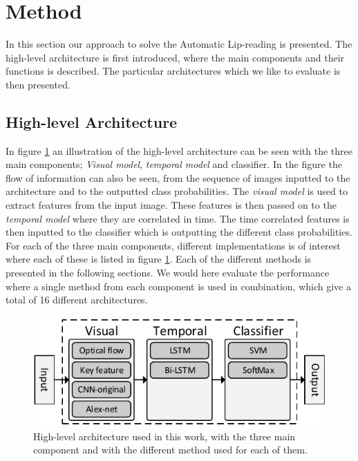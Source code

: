\section{Method}
\label{sec:method}

In this section our approach to solve the Automatic Lip-reading is presented.
The high-level architecture is first introduced, where the main components and their functions is described.
The particular architectures which we like to evaluate is then presented.

\subsection{High-level Architecture}
In figure \ref{fig:highLevelArchitecture} an illustration of the high-level architecture can be seen with the three main components; \textit{Visual model}, \textit{temporal model} and classifier.
In the figure the flow of information can also be seen, from the sequence of images inputted to the architecture and to the outputted class probabilities. 
The \textit{visual model} is used to extract features from the input image.
These features is then passed on to the \textit{temporal model} where they are correlated in time.
The time correlated features is then inputted to the classifier which is outputting the different class probabilities.
For each of the three main components, different implementations is of interest where each of these is listed in figure \ref{fig:highLevelArchitecture}. 
Each of the different methods is presented in the following sections.
We would here evaluate the performance where a single method from each component is used in combination, which give a total of 16 different architectures.
\begin{figure}[h]
    \centering
    \includegraphics[width=\columnwidth]{fig/highLevelArchitecture.pdf}
    \caption{High-level architecture used in this work, with the three main component and with the different method used for each of them.}
    \label{fig:highLevelArchitecture}
\end{figure}

